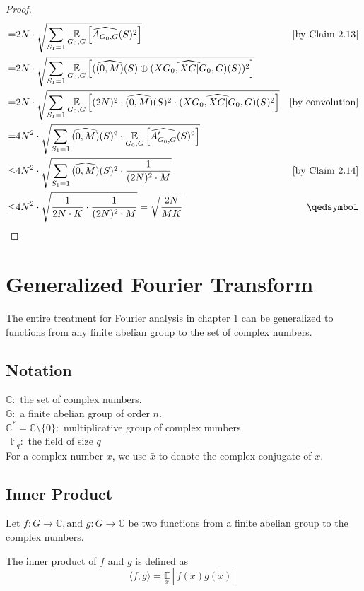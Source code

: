 \begin{proof}
\begin{align*}
= & 2N \cdot \sqrt{
	\sum\limits_{S_1 = 1} \underset{G_0, G} {\mathbb{E}} \left[  
		\widehat{A_{G_0,G}}(S)^2 \right] } & \text{[by Claim 2.13]}\\
= & 2N \cdot \sqrt{
	\sum\limits_{S_1 = 1} \underset{G_0, G} {\mathbb{E}} \left[  
		(\widehat{(0, M)}(S) \oplus
		\widehat{(XG_0, XG |G_0, G)}(S))^2 \right] } \\		
= & 2N \cdot \sqrt{
	\sum\limits_{S_1 = 1} \underset{G_0, G} {\mathbb{E}} \left[  
		(2N)^2 \cdot \widehat{(0, M)}(S)^2 \cdot 
		\widehat{(XG_0, XG |G_0, G)}(S)^2 \right] } &\text{[by convolution]}\\
=& 4N^2 \cdot \sqrt{
	\sum\limits_{S_1 = 1} \widehat{(0, M)}(S)^2 \cdot 
		\underset{G_0, G} {\mathbb{E}} \left[  
		\widehat{A'_{G_0,G}}(S)^2 \right] } 	\\ 
\leq & 4N^2 \cdot  \sqrt{
	\sum\limits_{S_1 = 1} \widehat{(0, M)}(S)^2 \cdot 
		\frac{1} {(2N)^2 \cdot M} } &\text{[by Claim 2.14]}	\\
\leq &	4N^2 \cdot \sqrt{
	\frac{1}{2N \cdot K} \cdot 
		\frac{1} {(2N)^2 \cdot M} }
=  \sqrt{\frac{2N}{MK}}		& \qedsymbol				     		                                 
\end{align*} 
\end{proof}

\chapter{Generalized Fourier Transform}
The entire treatment for Fourier analysis in chapter 1 can be generalized to functions from any finite abelian group to the set of complex numbers.

\section{Notation}
$\mathbb{C}:$ the set of complex numbers. \\
$\mathbb{G}:$ a finite abelian group of order $n$.\\
$\mathbb{C}^* = \mathbb{C} \setminus \{0\}:$ multiplicative group of complex numbers. \\\
$\mathbb{F}_q:$ the field of size $q$ \\
For a complex number $x$, we use $\bar{x}$ to denote the complex conjugate of $x$.

\section{Inner Product}
Let $f : G \rightarrow \mathbb{C}, \text{and } g : G \rightarrow \mathbb{C}$ be two functions from a finite abelian group to the complex numbers. 
\begin{definition}
The inner product of $f$ and $g$ is defined as 
$$\langle f, g \rangle = \underset {x} {\mathbb{E}} [f(x) \overline{g(x)}] $$
\end{definition}

